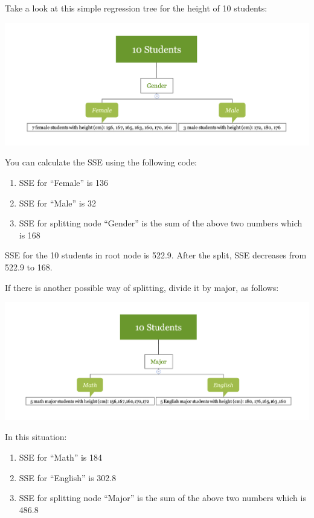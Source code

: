 \documentclass[12pt,]{krantz}
\providecommand{\tightlist}{%
  \setlength{\itemsep}{0pt}\setlength{\parskip}{0pt}}
\begin{document}
Take a look at this simple regression tree for the height of 10 students:

\includegraphics{images/varEN.png}

You can calculate the SSE using the following code:

\begin{enumerate}
\def\labelenumi{\arabic{enumi}.}
\tightlist
\item
  SSE for ``Female'' is 136
\item
  SSE for ``Male'' is 32
\item
  SSE for splitting node ``Gender'' is the sum of the above two numbers which is 168
\end{enumerate}

SSE for the 10 students in root node is 522.9. After the split, SSE decreases from 522.9 to 168.

If there is another possible way of splitting, divide it by major, as follows:

\includegraphics{images/varEN2.png}

In this situation:

\begin{enumerate}
\def\labelenumi{\arabic{enumi}.}
\tightlist
\item
  SSE for ``Math'' is 184
\item
  SSE for ``English'' is 302.8
\item
  SSE for splitting node ``Major'' is the sum of the above two numbers which is 486.8
\end{enumerate}
\end{document}
